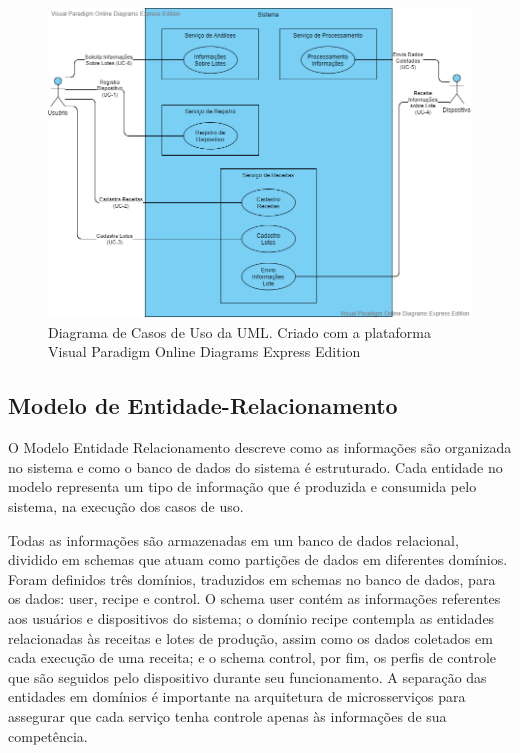 \begin{figure}[h]
    \centering
    \includegraphics[scale=0.45]{figuras/projeto/software/diagrama_casos_de_uso.png}
    \caption{Diagrama de Casos de Uso da UML. Criado com a plataforma Visual Paradigm Online Diagrams Express Edition}
    \label{fig:usecases}
\end{figure}

\subsection{Modelo de Entidade-Relacionamento}

O Modelo Entidade Relacionamento descreve como as informações são organizada no sistema e como o banco de dados do sistema é estruturado. 
Cada entidade no modelo representa um tipo de informação que é produzida e consumida pelo sistema, na execução dos casos de uso. 

Todas as informações são armazenadas em um banco de dados relacional, dividido em schemas que atuam como partições de dados em diferentes domínios. 
Foram definidos três domínios, traduzidos em schemas no banco de dados, para os dados: user, recipe e control. O schema user contém as informações 
referentes aos usuários e dispositivos do sistema; o domínio recipe contempla as entidades relacionadas às receitas e lotes de produção, assim como 
os dados coletados em cada execução de uma receita; e o schema control, por fim, os perfis de controle que são seguidos pelo dispositivo durante 
seu funcionamento. A separação das entidades em domínios é importante na arquitetura de microsserviços para assegurar que cada serviço tenha 
controle apenas às informações de sua competência. 

